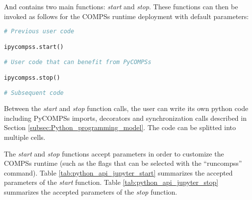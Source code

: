 And contains two main functions: {\it start} and {\it stop}. These functions can then be invoked as follows for the COMPSs runtime deployment with default parameters:

\begin{lstlisting}[language=python]
# Previous user code

ipycompss.start()

# User code that can benefit from PyCOMPSs

ipycompss.stop()

# Subsequent code
\end{lstlisting}

Between the {\it start} and {\it stop} function calls, the user can write its own python code including PyCOMPSs imports, decorators and synchronization calls described in Section \ref{subsec:Python_programming_model}.
The code can be splitted into multiple cells.

The {\it start} and {\it stop} functions accept parameters in order to customize the COMPSs runtime (such as the flags that can be selected with the ``runcompss'' command).
Table \ref{tab:python_api_jupyter_start} summarizes the accepted parameters of the {\it start} function.
Table \ref{tab:python_api_jupyter_stop} summarizes the accepted parameters of the {\it stop} function.

